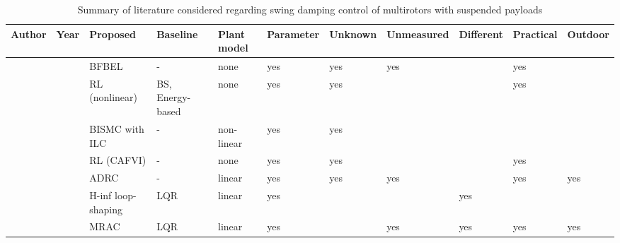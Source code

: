 \begin{landscape}
\begin{tiny}
\begin{table}[!htbp]
    \renewcommand{\arraystretch}{1.1}
    \centering
    \caption{Summary of literature considered regarding swing damping control of multirotors with suspended payloads}
    \begin{tabularx}{\linewidth}{@{}lllllllllll@{}}
        \toprule
            \textbf{Author}              & \textbf{Year}                   & \textbf{Proposed}          & \textbf{Baseline}      & \textbf{Plant model} & \textbf{Parameter} & \textbf{Unknown} & \textbf{Unmeasured} & \textbf{Different} & \textbf{Practical} & \textbf{Outdoor} \\
        \midrule
            \citet{Muthusamy2021a}       & \citeyear{Muthusamy2021a}       & \gls{BFBEL}                & -                      & none                 & yes                & yes              & yes                 &                    & yes                &                  \\
            \citet{Hua2021}              & \citeyear{Hua2021}              & \gls{RL} (nonlinear)       & \gls{BS}, Energy-based & none                 & yes                & yes              &                     &                    & yes                &                  \\
            \citet{Allahverdy2021}       & \citeyear{Allahverdy2021}       & \gls{BISMC} with \gls{ILC} & -                      & non-linear           & yes                & yes              &                     &                    &                    &                  \\
            \citet{Faust2014}            & \citeyear{Faust2014}            & \gls{RL} (\gls{CAFVI})     & -                      & none                 & yes                & yes              &                     &                    & yes                &                  \\
            \citet{Wang2020}             & \citeyear{Wang2020}             & \gls{ADRC}                 & -                      & linear               & yes                & yes              & yes                 &                    & yes                & yes              \\
            \citet{Taylor2020}           & \citeyear{Taylor2020}           & \gls{H-inf} loop-shaping   & \gls{LQR}              & linear               & yes                &                  &                     & yes                &                    &                  \\
            \citet{Erasmus2020}          & \citeyear{Erasmus2020}          & \gls{MRAC}                 & \gls{LQR}              & linear               & yes                &                  & yes                 & yes                & yes                & yes              \\

\end{tabularx}
\end{table}
\end{tiny}
\end{landscape}
